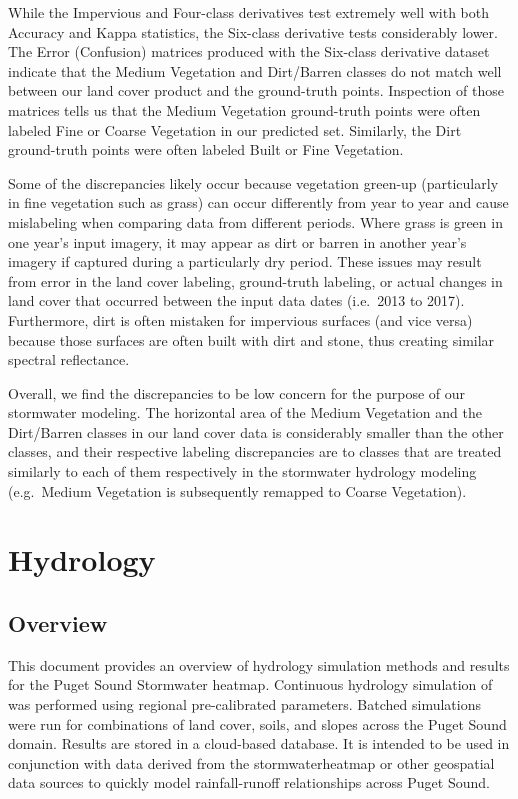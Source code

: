 \documentclass[
]{report}
\begin{document}
While the Impervious and Four-class derivatives test extremely well with both Accuracy and Kappa statistics, the Six-class derivative tests considerably lower. The Error (Confusion) matrices produced with the Six-class derivative dataset indicate that the Medium Vegetation and Dirt/Barren classes do not match well between our land cover product and the ground-truth points. Inspection of those matrices tells us that the Medium Vegetation ground-truth points were often labeled Fine or Coarse Vegetation in our predicted set. Similarly, the Dirt ground-truth points were often labeled Built or Fine Vegetation.

Some of the discrepancies likely occur because vegetation green-up (particularly in fine vegetation such as grass) can occur differently from year to year and cause mislabeling when comparing data from different periods. Where grass is green in one year's input imagery, it may appear as dirt or barren in another year's imagery if captured during a particularly dry period. These issues may result from error in the land cover labeling, ground-truth labeling, or actual changes in land cover that occurred between the input data dates (i.e.~2013 to 2017). Furthermore, dirt is often mistaken for impervious surfaces (and vice versa) because those surfaces are often built with dirt and stone, thus creating similar spectral reflectance.

Overall, we find the discrepancies to be low concern for the purpose of our stormwater modeling. The horizontal area of the Medium Vegetation and the Dirt/Barren classes in our land cover data is considerably smaller than the other classes, and their respective labeling discrepancies are to classes that are treated similarly to each of them respectively in the stormwater hydrology modeling (e.g.~Medium Vegetation is subsequently remapped to Coarse Vegetation).

\hypertarget{hydrology}{%
\chapter{Hydrology}\label{hydrology}}

\hypertarget{overview-1}{%
\section{Overview}\label{overview-1}}

This document provides an overview of hydrology simulation methods and results for the Puget Sound Stormwater heatmap. Continuous hydrology simulation of was performed using regional pre-calibrated parameters. Batched simulations were run for combinations of land cover, soils, and slopes across the Puget Sound domain. Results are stored in a cloud-based database. It is intended to be used in conjunction with data derived from the stormwaterheatmap or other geospatial data sources to quickly model rainfall-runoff relationships across Puget Sound.
\end{document}
